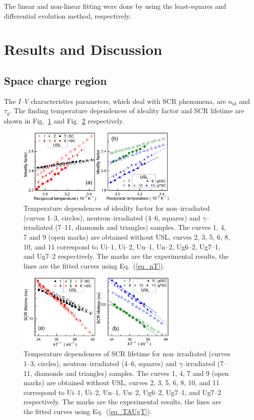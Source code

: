 \documentclass[aip,jap, amsmath,amssymb,reprint]{revtex4-1}
\begin{document}
The linear and non-linear fitting were done by using the least-squares and differential evolution \cite{DEWang} method, respectively.


\section{Results and Discussion}
\subsection{Space charge region\label{SCR}}
The $I$--$V$ characteristics parameters, which deal with SCR phenomena, are $n_{\mathrm{id}}$ and $\tau_{g}$.
The finding temperature dependences of ideality factor and SCR lifetime are shown in Fig.~\ref{fig_n} and Fig.~\ref{fig_TAUg} respectively.

\begin{figure}
\includegraphics[width=0.7\textwidth]{olikhFig2}%
\caption{\label{fig_n}
Temperature dependences of ideality factor for non--irradiated (curves 1--3, circles),
neutron--irradiated (4--6, squares) and $\gamma$--irradiated (7--11, diamonds and triangles) samples.
The curves 1, 4, 7 and 9 (open marks) are obtained without USL,
curves 2, 3, 5, 6, 8, 10, and 11 correspond to
Ui--1, Ui--2, Un--1, Un--2, Ug6--2, Ug7--1, and Ug7--2 respectively.
The marks are the experimental results, the lines are the fitted curves using Eq.~(\ref{eq_nT}).
}%
\end{figure}

\begin{figure}
\includegraphics[width=0.7\textwidth]{olikhFig3}%
\caption{\label{fig_TAUg}
Temperature dependences of SCR lifetime for non--irradiated (curves 1--3, circles),
neutron--irradiated (4--6, squares) and $\gamma$--irradiated (7--11, diamonds and triangles) samples.
The curves 1, 4, 7 and 9 (open marks) are obtained without USL,
curves 2, 3, 5, 6, 8, 10, and 11 correspond to
Ui--1, Ui--2, Un--1, Un--2, Ug6--2, Ug7--1, and Ug7--2 respectively.
The marks are the experimental results, the lines are the fitted curves using Eq.~(\ref{eq_TAUgT}).
}%
\end{figure}
\end{document}

